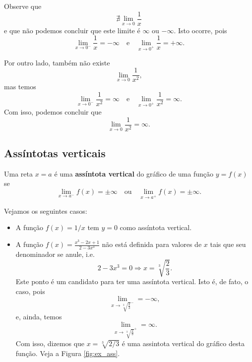\begin{ex}
  Observe que
  \begin{equation}
    \nexists \lim_{x\to 0} \frac{1}{x}
  \end{equation}
  e que não podemos concluir que este limite é $\infty$ ou $-\infty$. Isto ocorre, pois
  \begin{equation}
    \lim_{x\to 0^-} \frac{1}{x} = -\infty\quad\text{e}\quad\lim_{x\to 0^+} \frac{1}{x} = +\infty.
  \end{equation}

  Por outro lado, também não existe
  \begin{equation}
    \lim_{x\to 0} \frac{1}{x^2},
  \end{equation}
  mas temos
  \begin{equation}
    \lim_{x\to 0^-} \frac{1}{x^2} = \infty\quad\text{e}\quad\lim_{x\to 0^+} \frac{1}{x^2} = \infty.
  \end{equation}
  Com isso, podemos concluir que
  \begin{equation}
    \lim_{x\to 0} \frac{1}{x^2} = \infty.
  \end{equation}
\end{ex}

\subsection{Assíntotas verticais}

Uma reta $x=a$ é uma {\bf assíntota vertical} do gráfico de uma função $y = f(x)$ se
\begin{equation}
  \lim_{x\to a^-} f(x) = \pm\infty\quad\text{ou}\quad\lim_{x\to a^+} f(x) = \pm\infty.
\end{equation}

\begin{ex}
  Vejamos os seguintes casos:
  \begin{itemize}
  \item A função $f(x) = 1/x$ tem $y = 0$ como assíntota vertical.
  \item A função $\displaystyle f(x) = \frac{x^3 - 2x + 1}{2 - 3x^3}$ não está definida para valores de $x$ tais que seu denominador se anule, i.e.
    \begin{equation}
      2 - 3x^3 = 0 \Rightarrow x = \sqrt[3]{\frac{2}{3}}.
    \end{equation}
    Este ponto é um candidato para ter uma assíntota vertical. Isto é, de fato, o caso, pois
    \begin{equation}
      \lim_{x\to \sqrt[3]{\frac{2}{3}}^-} = -\infty, 
    \end{equation}
    e, ainda, temos
    \begin{equation}
      \lim_{x\to \sqrt[3]{\frac{2}{3}}^+} = \infty.
    \end{equation}
    Com isso, dizemos que $x = \sqrt[3]{2/3}$ é uma assintota vertical do gráfico desta função. Veja a Figura \ref{fig:ex_ass}.
  \end{itemize}
\end{ex}

